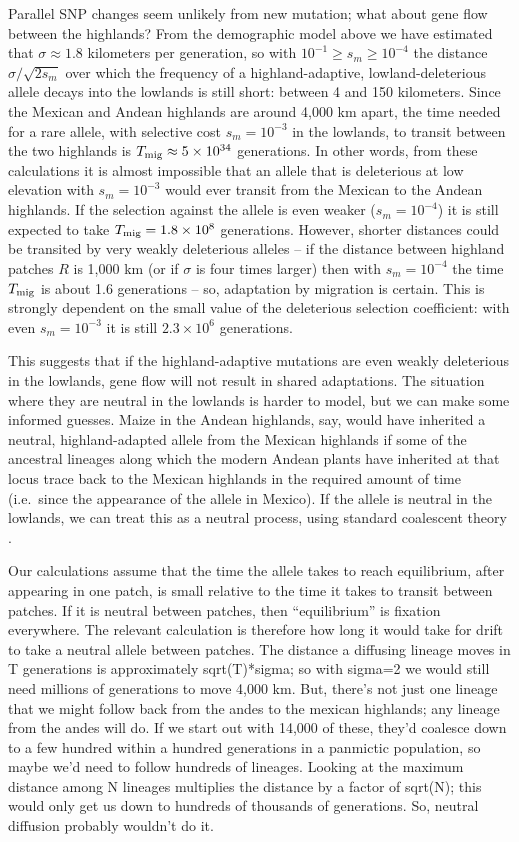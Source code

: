 {Parallel SNP changes seem unlikely from new mutation; 
what about gene flow between the highlands?
From the demographic model above
we have estimated that $\sigma \approx 1.8$ kilometers per generation,
so with $10^{-1} \ge s_m \ge 10^{-4}$ the distance $\sigma/\sqrt{2s_m}$ over which the frequency of 
a highland-adaptive, lowland-deleterious allele decays into the lowlands
is still short: between 4 and 150 kilometers.
Since the Mexican and Andean highlands are around 4,000 km apart,
the time needed for a rare allele, with selective cost $s_m=10^{-3}$ in the lowlands, to transit between the two highlands
is $T_{\text{mig}} \approx 5 \times 10^{34}$ generations.
In other words, from these calculations it is almost impossible that an allele that is deleterious at low elevation with $s_m=10^{-3}$ 
would ever transit from the Mexican to the Andean highlands.
If the selection against the allele is even weaker ($s_m=10^{-4}$) it is still expected to take $T_{\text{mig}} = 1.8 \times 10^8$ generations.
However, shorter distances could be transited by very weakly deleterious alleles --
if the distance between highland patches $R$ is 1,000 km (or if $\sigma$ is four times larger)
then with $s_m=10^{-4}$ the time $T_{\text{mig}}$ is about 1.6 generations --
so, adaptation by migration is certain.
This is strongly dependent on the small value of the deleterious selection coefficient: 
with even $s_m=10^{-3}$ it is still $2.3 \times 10^6$ generations.

This suggests that if the highland-adaptive mutations are even weakly deleterious in the lowlands,
gene flow will not result in shared adaptations.
The situation where they are neutral in the lowlands is harder to model,
but we can make some informed guesses.
Maize in the Andean highlands, say, would have inherited a neutral, highland-adapted allele from the Mexican highlands 
if some of the ancestral lineages along which the modern Andean plants have inherited at that locus trace back to the Mexican highlands in the required amount of time
(i.e.\ since the appearance of the allele in Mexico).
If the allele is neutral in the lowlands, we can treat this as a neutral process,
using standard coalescent theory \citep{wakeley}.


Our calculations assume that the time the allele takes to reach equilibrium, after appearing in one patch, is small relative to the time it takes to transit between patches.  If it is neutral between patches, then ``equilibrium'' is fixation everywhere.  The relevant calculation is therefore how long it would take for drift to take a neutral allele between patches.  The distance a diffusing lineage moves in T generations is approximately sqrt(T)*sigma; so with sigma=2 we would still need millions of generations to move 4,000 km.  But, there's not just one lineage that we might follow back from the andes to the mexican highlands; any lineage from the andes will do.  If we start out with 14,000 of these, they'd coalesce down to a few hundred within a hundred generations in a panmictic population, so maybe we'd need to follow hundreds of lineages.  Looking at the maximum distance among N lineages multiplies the distance by a factor of sqrt(N); this would only get us down to hundreds of thousands of generations.  So, neutral diffusion probably wouldn't do it.

}
